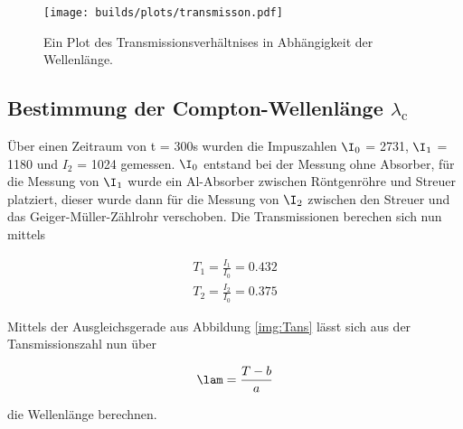             \begin{figure}
                \centering
                \texttt{[image: builds/plots/transmisson.pdf]}
                \caption{Ein Plot des Transmissionsverhältnises in Abhängigkeit der Wellenlänge.}
                \label{img:Trans}
            \end{figure}

    \subsection{Bestimmung der Compton-Wellenlänge $\lambda_{\text{c}}$}

        \noindent Über einen Zeitraum von t = 300s wurden die Impuszahlen $\I_0$ = 2731, $\I_1$ = 1180 und $I_2$ = 1024 gemessen.
        $\I_0$ entstand bei der Messung ohne Absorber, für die Messung von $\I_1$ wurde ein Al-Absorber zwischen Röntgenröhre und 
        Streuer platziert, dieser wurde dann für die Messung von $\I_2$ zwischen den Streuer und das Geiger-Müller-Zählrohr verschoben.
        Die Transmissionen berechen sich nun mittels

            \begin{align}
                T_1 = \frac{I_1}{I_0} = 0.432   \nonumber\\
                T_2 = \frac{I_2}{I_0} = 0.375   \nonumber
            \end{align}

        \noindent Mittels der Ausgleichsgerade aus Abbildung \ref{img:Tans} lässt sich aus der Tansmissionszahl nun über 
            
            \begin{equation*}
                \lam = \frac{T - b}{a}
            \end{equation*}

        \noindent die Wellenlänge berechnen. 
            

    


    